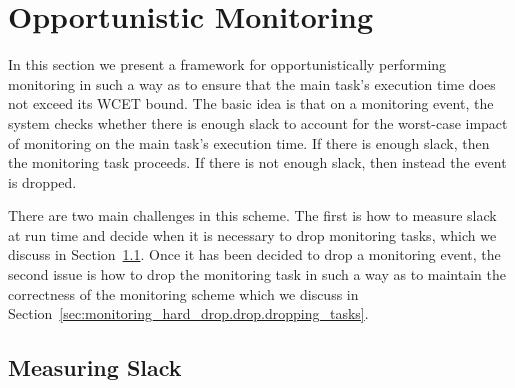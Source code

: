 \section{Opportunistic Monitoring}
\label{sec:monitoring_hard_drop.drop}

In this section we present a framework for opportunistically performing
monitoring in such a way as to ensure that the main task's execution time does
not exceed its WCET bound. The basic idea is that on a monitoring event, the
system checks whether there is enough slack to account for the worst-case
impact of monitoring on the main task's execution time. If there is enough
slack, then the monitoring task proceeds. If there is not enough slack, then
instead the event is dropped. 

There are two main challenges in this scheme. The first is how to measure slack
at run time and decide when it is necessary to drop monitoring tasks, which we
discuss in Section~\ref{sec:monitoring_hard_drop.drop.slack}. Once it has been
decided to drop a monitoring event, the second issue is how to drop the
monitoring task in such a way as to maintain the correctness of the monitoring
scheme which we discuss in
Section~\ref{sec:monitoring_hard_drop.drop.dropping_tasks}.

\subsection{Measuring Slack}
\label{sec:monitoring_hard_drop.drop.slack}

